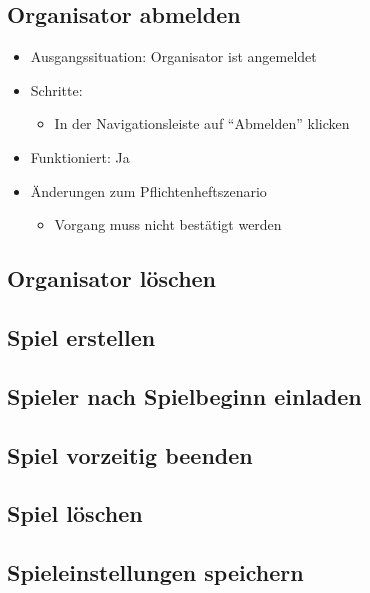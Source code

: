 \documentclass[a4paper]{scrreprt}
\begin{document}
            \subsection{Organisator abmelden}
            \begin{itemize}
                \item Ausgangssituation: Organisator ist angemeldet
                \item Schritte:
                    \begin{itemize}
                        \item In der Navigationsleiste auf \enquote{Abmelden} klicken
                    \end{itemize}
                \item Funktioniert: Ja
                \item Änderungen zum Pflichtenheftszenario
                    \begin{itemize}
                        \item Vorgang muss nicht bestätigt werden
                    \end{itemize}
            \end{itemize}

            \subsection{Organisator löschen}

            \subsection{Spiel erstellen}

            \subsection{Spieler nach Spielbeginn einladen}

            \subsection{Spiel vorzeitig beenden}

            \subsection{Spiel löschen}

            \subsection{Spieleinstellungen speichern}
\end{document}
